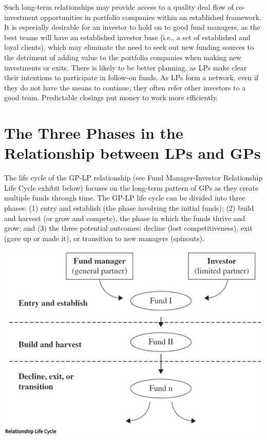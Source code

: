 \documentclass[11pt]{article}
\begin{document}
Such long-term relationships may provide access to a quality deal flow of co-investment opportunities in portfolio companies within an established framework. It is especially desirable for an investor to hold on to good fund managers, as the best teams will have an established investor base (i.e., a set of established and loyal clients), which may eliminate the need to seek out new funding sources to the detriment of adding value to the portfolio companies when making new investments or exits. There is likely to be better planning, as LPs make clear their intentions to participate in follow-on funds. As LPs form a network, even if they do not have the means to continue, they often refer other investors to a good team. Predictable closings put money to work more efficiently.

\section*{The Three Phases in the Relationship between LPs and GPs}
The life cycle of the GP-LP relationship (see Fund Manager-Investor Relationship Life Cycle exhibit below) focuses on the long-term pattern of GPs as they create multiple funds through time. The GP-LP life cycle can be divided into three phases: (1) entry and establish (the phase involving the initial funds); (2) build and harvest (or grow and compete), the phase in which the funds thrive and grow; and (3) the three potential outcomes: decline (lost competitiveness), exit (gave up or made it), or transition to new managers (spinouts).

\begin{center}
\includegraphics[max width=\textwidth]{2024_04_10_f548a09b7062d16b2a5eg-2}
\end{center}
\end{document}
